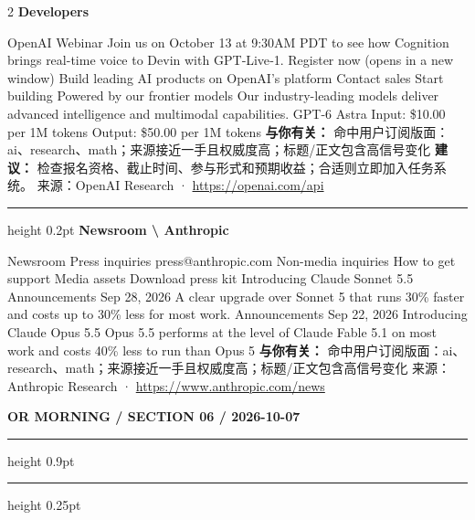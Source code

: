 \documentclass[10.5pt]{ctexart}
\begin{document}
\begin{multicols}{2}
{\large\bfseries Developers}\par
OpenAI Webinar Join us on October 13 at 9:30AM PDT to see how Cognition brings real-time voice to Devin with GPT‑Live‑1. Register now (opens in a new window) Build leading AI products on OpenAI’s platform Contact sales Start building Powered by our frontier models Our industry-leading models deliver advanced intelligence and multimodal capabilities. GPT-6 Astra Input: \$10.00 per 1M tokens Output: \$50.00 per 1M tokens
\textbf{与你有关：} 命中用户订阅版面：ai、research、math；来源接近一手且权威度高；标题/正文包含高信号变化
\textbf{建议：} 检查报名资格、截止时间、参与形式和预期收益；合适则立即加入任务系统。
{\footnotesize\color{ormuted} 来源：OpenAI Research · \url{https://openai.com/api}}
\vspace{2mm}
\hrule height 0.2pt
\vspace{2mm}
{\large\bfseries Newsroom \textbackslash{} Anthropic}\par
Newsroom Press inquiries press@anthropic.com Non-media inquiries How to get support Media assets Download press kit Introducing Claude Sonnet 5.5 Announcements Sep 28, 2026 A clear upgrade over Sonnet 5 that runs 30\% faster and costs up to 30\% less for most work. Announcements Sep 22, 2026 Introducing Claude Opus 5.5 Opus 5.5 performs at the level of Claude Fable 5.1 on most work and costs 40\% less to run than Opus 5
\textbf{与你有关：} 命中用户订阅版面：ai、research、math；来源接近一手且权威度高；标题/正文包含高信号变化
{\footnotesize\color{ormuted} 来源：Anthropic Research · \url{https://www.anthropic.com/news}}
\end{multicols}
\newpage
{\small\bfseries OR MORNING / SECTION 06 / 2026-10-07}
\vspace{2mm}
\hrule height 0.9pt
\vspace{1.5mm}
\hrule height 0.25pt
\vspace{4mm}
\end{document}
